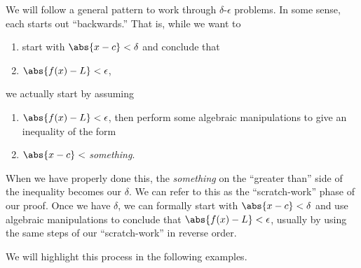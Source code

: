 We will follow a general pattern to work through $\delta$-$\epsilon$ problems. In some sense, each starts out ``backwards.'' That is, while we want to
\begin{enumerate}
	\item start with $\abs{x-c}<\delta$ and conclude that
	\item $\abs{f(x)-L}<\epsilon$,
\end{enumerate}
we actually start by assuming 
\begin{enumerate}
	\item $\abs{f(x)-L}<\epsilon$, then perform some algebraic manipulations to give an inequality of the form
	\item $\abs{x-c}<$ \textit{something}.
\end{enumerate} 
When we have properly done this, the \textit{something} on the ``greater than'' side of the inequality becomes our $\delta$. We can refer to this as the ``scratch-work'' phase of our proof. Once we have $\delta$, we can formally start with $\abs{x-c}<\delta$ and use algebraic manipulations to conclude that $\abs{f(x)-L}<\epsilon$, usually by using the same steps of our ``scratch-work'' in reverse order.

We will highlight this process in the following examples.

